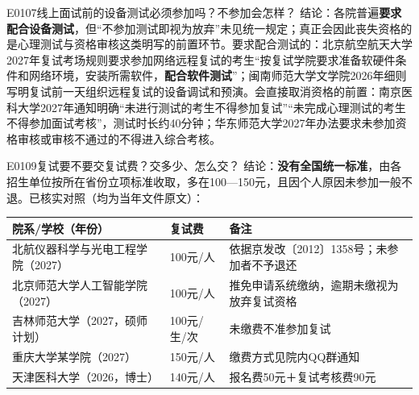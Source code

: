 \begin{qa}{E0107}{线上面试前的设备测试必须参加吗？不参加会怎样？}
结论：各院普遍\textbf{要求配合设备测试}，但“不参加测试即视为放弃”未见统一规定；真正会因此丧失资格的是心理测试与资格审核这类明写的前置环节。要求配合测试的：北京航空航天大学2027年复试考场规则要求参加网络远程复试的考生“按复试学院要求准备软硬件条件和网络环境，安装所需软件，\textbf{配合软件测试}”；闽南师范大学文学院2026年细则写明复试前一天组织远程复试的设备调试和预演。会直接取消资格的前置：南京医科大学2027年通知明确“未进行测试的考生不得参加复试”“未完成心理测试的考生不得参加面试考核”，测试时长约40分钟；华东师范大学2027年办法要求未参加资格审核或审核不通过的不得进入综合考核。
\end{qa}

\begin{qa}{E0109}{复试要不要交复试费？交多少、怎么交？}
结论：\textbf{没有全国统一标准}，由各招生单位按所在省份立项标准收取，多在100—150元，且因个人原因未参加一般不退。已核实对照（均为当年文件原文）：

\par\vspace{2pt}\nobreak\begin{center}\footnotesize
\begin{tabularx}{\textwidth}{>{\raggedright\arraybackslash}X>{\raggedright\arraybackslash}X>{\raggedright\arraybackslash}X}
\toprule
\textbf{院系/学校（年份）} & \textbf{复试费} & \textbf{备注} \\ \midrule
北航仪器科学与光电工程学院（2027） & 100元/人 & 依据京发改〔2012〕1358号；未参加者不予退还 \\
北京师范大学人工智能学院（2027） & 100元/人 & 推免申请系统缴纳，逾期未缴视为放弃复试资格 \\
吉林师范大学（2027，硕师计划） & 100元/生/次 & 未缴费不准参加复试 \\
重庆大学某学院（2027） & 150元/人 & 缴费方式见院内QQ群通知 \\
天津医科大学（2026，博士） & 140元/人 & 报名费50元＋复试考核费90元 \\
\bottomrule
\end{tabularx}
\end{center}\vspace{2pt}\par
{}
\end{qa}

